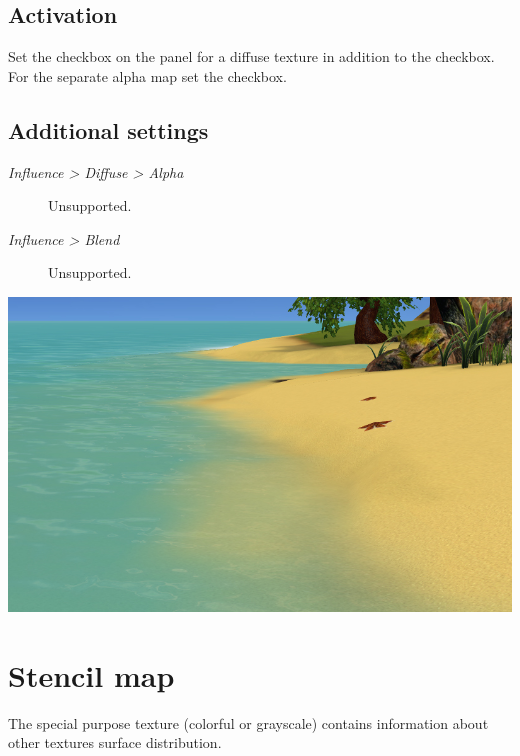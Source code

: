 \documentclass[a4paper,12pt,oneside]{sphinxmanual}
\begin{document}
\subsection{Activation}
\label{textures:id12}
Set the  checkbox on the  panel for a diffuse texture in addition to the  checkbox. For the separate alpha map set the  checkbox.


\subsection{Additional settings}
\label{textures:id13}\begin{description}
\item[{\emph{Influence \textgreater{} Diffuse \textgreater{} Alpha}}] \leavevmode
Unsupported.

\item[{\emph{Influence \textgreater{} Blend}}] \leavevmode
Unsupported.

\end{description}

{\hfill\includegraphics[width=1.000\linewidth]{alpha_map_water.jpg}\hfill}

\begin{DUlineblock}{0em}
\item[] 
\end{DUlineblock}


\section{Stencil map}
\label{textures:stencil-map}\label{textures:index-9}
The special purpose texture (colorful or grayscale) contains information about other textures surface distribution.
\end{document}
